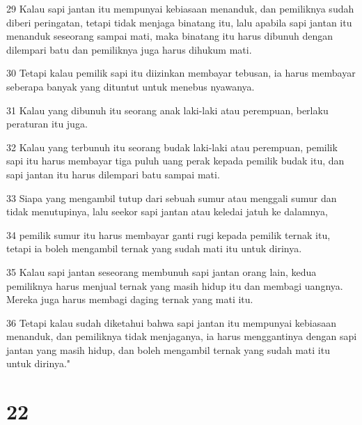 \par 29 Kalau sapi jantan itu mempunyai kebiasaan menanduk, dan pemiliknya sudah diberi peringatan, tetapi tidak menjaga binatang itu, lalu apabila sapi jantan itu menanduk seseorang sampai mati, maka binatang itu harus dibunuh dengan dilempari batu dan pemiliknya juga harus dihukum mati.
\par 30 Tetapi kalau pemilik sapi itu diizinkan membayar tebusan, ia harus membayar seberapa banyak yang dituntut untuk menebus nyawanya.
\par 31 Kalau yang dibunuh itu seorang anak laki-laki atau perempuan, berlaku peraturan itu juga.
\par 32 Kalau yang terbunuh itu seorang budak laki-laki atau perempuan, pemilik sapi itu harus membayar tiga puluh uang perak kepada pemilik budak itu, dan sapi jantan itu harus dilempari batu sampai mati.
\par 33 Siapa yang mengambil tutup dari sebuah sumur atau menggali sumur dan tidak menutupinya, lalu seekor sapi jantan atau keledai jatuh ke dalamnya,
\par 34 pemilik sumur itu harus membayar ganti rugi kepada pemilik ternak itu, tetapi ia boleh mengambil ternak yang sudah mati itu untuk dirinya.
\par 35 Kalau sapi jantan seseorang membunuh sapi jantan orang lain, kedua pemiliknya harus menjual ternak yang masih hidup itu dan membagi uangnya. Mereka juga harus membagi daging ternak yang mati itu.
\par 36 Tetapi kalau sudah diketahui bahwa sapi jantan itu mempunyai kebiasaan menanduk, dan pemiliknya tidak menjaganya, ia harus menggantinya dengan sapi jantan yang masih hidup, dan boleh mengambil ternak yang sudah mati itu untuk dirinya."

\chapter{22}

